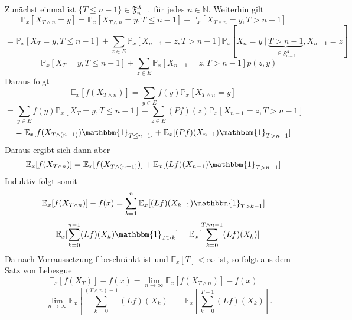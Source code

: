 Zunächst einmal ist $\lbrace T \leq n-1 \rbrace \in \mathfrak{F}_{n-1}^{X}$ für jedes $n \in \mathbb{N}$. Weiterhin gilt 
\begin{equation*}
\mathbb{P}_{x}[X_{T \wedge n} = y] = \mathbb{P}_{x}[X_{T \wedge n} = y, T \leq n - 1] + \mathbb{P}_{x}[X_{T \wedge n} = y, T > n - 1]
\end{equation*}
\begin{equation*}
= \mathbb{P}_{x}[X_{T} = y, T \leq n-1] + \sum_{z \in E} \mathbb{P}_{x}[X_{n-1}=z, T > n-1]\mathbb{P}_{x}[X_{n}=y \:| \: \underbrace{T > n-1}_{\in \mathfrak{F}_{n-1}^{X}}, X_{n-1} = z]
\end{equation*}
\begin{equation*}
= \mathbb{P}_{x}[X_{T} = y, T \leq n-1] + \sum_{z \in E} \mathbb{P}_{x}[X_{n-1}=z, T > n-1]p(z,y)
\end{equation*}
Daraus folgt
\begin{equation*}
\mathbb{E}_{x}[f(X_{T \wedge n})] = \sum_{y \in E} f(y) \mathbb{P}_{x}[X_{T \wedge n}=y]
\end{equation*}
\begin{equation*}
= \sum_{y \in E} f(y) \mathbb{P}_{x}[X_{T} = y, T \leq n-1] + \sum_{z \in E} (Pf)(z) \mathbb{P}_{x}[X_{n-1}=z, T > n-1]
\end{equation*}
\begin{equation*}
= \mathbb{E}_{x}[f(X_{T \wedge (n-1)}) \mathbbm{1}_{T \leq n-1}] + \mathbb{E}_{x}[(Pf)(X_{n-1})\mathbbm{1}_{T > n-1}]
\end{equation*}
Daraus ergibt sich dann aber
\begin{equation*}
\mathbb{E}_{x}[f(X_{T \wedge n})] = \mathbb{E}_{x}[f(X_{T \wedge (n-1)})] + \mathbb{E}_{x}[(Lf)(X_{n-1})\mathbbm{1}_{T > n-1}]
\end{equation*}
Induktiv folgt somit
\begin{equation*}
\mathbb{E}_{x}[f(X_{T \wedge n})] - f(x) = \sum_{k=1}^{n} \mathbb{E}_{x}[(Lf)(X_{k-1})\mathbbm{1}_{T > k-1}]
\end{equation*}
\begin{equation*}
= \mathbb{E}_{x}[\sum_{k=0}^{n-1} (Lf)(X_{k})\mathbbm{1}_{T > k}] = \mathbb{E}_{x}[\sum_{k=0}^{T \wedge n-1} (Lf)(X_{k})]
\end{equation*}
Da nach Vorraussetzung f beschränkt ist und $\mathbb{E}_{x}[T]<\infty$ ist, so folgt aus dem Satz von Lebesgue
\begin{equation*}
\mathbb{E}_{x}[f(X_{T})] - f(x) = \lim_{n \to \infty} \mathbb{E}_{x}[f(X_{T \wedge n})] - f(x)
\end{equation*}
\begin{equation*}
= \lim_{n \to \infty} \mathbb{E}_{x}[\sum_{k=0}^{(T \wedge n)-1} (Lf)(X_{k})] =  \mathbb{E}_{x}[\sum_{k=0}^{T-1} (Lf)(X_{k})].
\end{equation*}